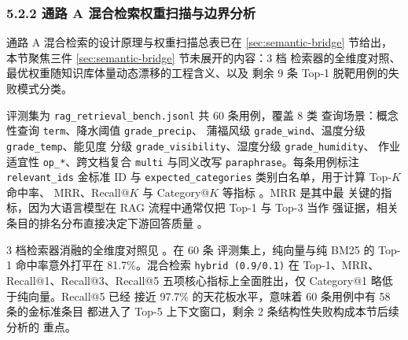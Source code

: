 
\subsubsection*{5.2.2 \quad 通路 A 混合检索权重扫描与边界分析}
\label{sec:rag-eval}

通路 A 混合检索的设计原理与权重扫描总表已在 \ref{sec:semantic-bridge}
节给出，本节聚焦三件 \ref{sec:semantic-bridge} 节未展开的内容：3 档
检索器的全维度对照、最优权重随知识库体量动态漂移的工程含义、以及
剩余 9 条 Top-1 脱靶用例的失败模式分类。

评测集为 \texttt{rag\_\bk{}retrieval\_\bk{}bench.\bk{}jsonl} 共 60 条用例，覆盖 8 类
查询场景：概念性查询 \texttt{term}、降水阈值 \texttt{grade\_\bk{}precip}、
蒲福风级 \texttt{grade\_\bk{}wind}、温度分级 \texttt{grade\_\bk{}temp}、能见度
分级 \texttt{grade\_\bk{}visibility}、湿度分级 \texttt{grade\_\bk{}humidity}、
作业适宜性 \texttt{op\_\bk{}*}、跨文档复合 \texttt{multi} 与同义改写
\texttt{paraphrase}。每条用例标注 \texttt{relevant\_\bk{}ids} 金标准 ID
与 \texttt{expected\_\bk{}categories} 类别白名单，用于计算 Top-$K$ 命中率、
MRR、Recall@$K$ 与 Category@$K$ 等指标 \cite{ref24}。MRR 是其中最
关键的指标，因为大语言模型在 RAG 流程中通常仅把 Top-1 与 Top-3 当作
强证据，相关条目的排名分布直接决定下游回答质量 \cite{ref12}。

3 档检索器消融的全维度对照见 。在 60 条
评测集上，纯向量与纯 BM25 的 Top-1 命中率意外打平在 81.7\%。混合检索
\texttt{hybrid (0.9/\bk{}0.1)} 在 Top-1、MRR、Recall@1、Recall@3、Recall@5
五项核心指标上全面胜出，仅 Category@1 略低于纯向量。Recall@5 已经
接近 97.7\% 的天花板水平，意味着 60 条用例中有 58 条的金标准条目
都进入了 Top-5 上下文窗口，剩余 2 条结构性失败构成本节后续分析的
重点。

